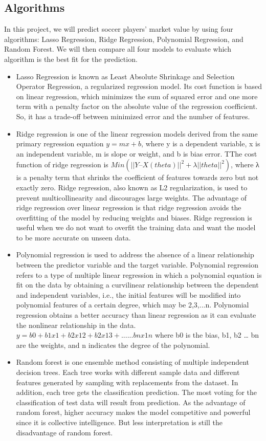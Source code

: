 \documentclass[conference]{IEEEtran}
\begin{document}
\subsection{Algorithms}
In this project, we will predict soccer players' market value by using four algorithms: Lasso Regression, Ridge Regression, Polynomial Regression, and Random Forest. We will then compare all four models to evaluate which algorithm is the best fit for the prediction.
\begin{itemize}
    \item Lasso Regression is known as Least Absolute Shrinkage and Selection Operator Regression, a regularized regression model. Its cost function is based on linear regression, which minimizes the sum of squared error and one more term with a penalty factor on the absolute value of the regression coefficient. So, it has a trade-off between minimized error and the number of features.
    \item Ridge regression is one of the linear regression models derived from the same primary regression equation \(y = mx + b\), where y is a dependent variable, x is an independent variable, m is slope or weight, and b is bias error. TThe cost function of ridge regression is \(Min(||Y – X(theta)||^2 + λ||theta||^2)\), where λ is a penalty term that shrinks the coefficient of features towards zero but not exactly zero. Ridge regression, also known as L2 regularization, is used to prevent multicollinearity and discourages large weights. The advantage of ridge regression over linear regression is that ridge regression avoids the overfitting of the model by reducing weights and biases. Ridge regression is useful when we do not want to overfit the training data and want the model to be more accurate on unseen data.
    \item Polynomial regression is used to address the absence of a linear relationship between the predictor variable and the target variable. Polynomial regression refers to a type of multiple linear regression in which a polynomial equation is fit on the data by obtaining a curvilinear relationship between the dependent and independent variables, i.e., the initial features will be modified into polynomial features of a certain degree, which may be 2,3,...n. Polynomial regression obtains a better accuracy than linear regression as it can evaluate the nonlinear relationship in the data. \(y= b0+b1x1+ b2x12+ b2x13+...... bnx1n\) where b0  is the bias, b1, b2 … bn are the weights, and n indicates the degree of the polynomial.
    \item Random forest is one ensemble method consisting of multiple independent decision trees. Each tree works with different sample data and different features generated by sampling with replacements from the dataset. In addition, each tree gets the classification prediction. The most voting for the classification of test data will result from prediction. As the advantage of random forest, higher accuracy makes the model competitive and powerful since it is collective intelligence. But less interpretation is still the disadvantage of random forest.



\end{itemize}
\end{document}

